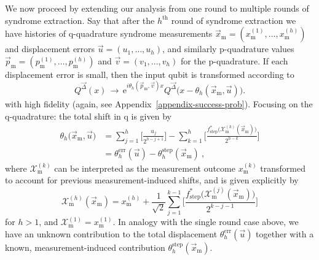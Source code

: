 \documentclass[prx,reprint,superscriptaddress,longbibliography,floatfix,nofootinbib]{revtex4-1}
\begin{document}
We now proceed by extending our analysis from one round to multiple rounds of syndrome extraction.
Say that after the $h^{\text{th}}$ round of syndrome extraction we have histories of q-quadrature syndrome measurements $\vec{x}_\mathrm{m}=(x_\mathrm{m}^{(1)},\dotsc ,x_\mathrm{m}^{(h)})$ and displacement errors $\vec{u}=(u_1,\dotsc ,u_h)$, and similarly p-quadrature values $\vec{p}_\mathrm{m}=(p_\mathrm{m}^{(1)},\dotsc ,p_\mathrm{m}^{(h)})$ and $\vec{v}=(v_1,\dotsc ,v_h)$ for the p-quadrature.
If each displacement error is small, then  the input qubit is transformed according to
%
\begin{equation}
Q^{\vec{\Delta}}(x) \, \xrightarrow[]{} \, \text{e}^{i\theta_h(\vec{p}_\mathrm{m},\vec{v})x} Q^{\vec{\Delta}}\big(x-\theta_h(\vec{x}_\mathrm{m},\vec{u})\big).
\label{eq:multistep-approx-transformation}
\end{equation}
%
with high fidelity (again, see Appendix\ \ref{appendix-success-prob}). Focusing on the q-quadrature: the total shift in q is given by
%
\begin{equation}
\begin{split}
\theta_h\big(\vec{x}_\mathrm{m},\vec{u}\big) &= \sum_{j=1}^{h}\Big[\frac{u_j}{2^{h-j+1}}\Big] -
\sum_{k=1}^{h}\Big[\frac{f_\text{step}^{*}\big(\mathcal{X}_\text{m}^{(k)}(\vec{x}_\mathrm{m})\big)}{2^{h-k}}\Big] \\
&= \theta_h^{\mathrm{err}}(\vec{u})-\theta_h^{\mathrm{step}}(\vec{x}_\mathrm{m}) \ ,
\label{eq:reference_frame}
\end{split}
\end{equation}
%
where $\mathcal{X}^{(k)}_{\text{m}}$ can be interpreted as the measurement outcome $x^{(k)}_{\text{m}}$ transformed to account for previous measurement-induced shifts, and is given explicitly by
%
\begin{equation}
\mathcal{X}^{(h)}_{\text{m}}(\vec{x}_\mathrm{m}) = x^{(h)}_{\text{m}} + \frac{1}{\sqrt{2}}\sum_{j=1}^{k-1}\Big[\frac{f_\text{step}^{*}\big(\mathcal{X}_\text{m}^{(j)}(\vec{x}_\mathrm{m})\big)}{2^{k-j-1}}\Big]
\end{equation}
for $h>1$, and $\mathcal{X}^{(1)}_{\text{m}} = x^{(1)}_{\text{m}}$. In analogy with the single round case above, we have an unknown contribution to the total displacement $\theta_h^{\mathrm{err}}(\vec{u})$ together with a known, measurement-induced contribution $\theta_h^{\mathrm{step}}(\vec{x}_\mathrm{m})$.
\end{document}
